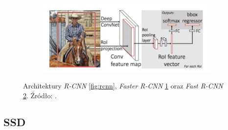 \begin{figure}
\begin{subfigure}[b]{0.45\textwidth}
         \caption{}
         \label{fig:ffrcnn}
     \end{subfigure}
     \hfill
    \begin{subfigure}[b]{0.9\textwidth}
         \centering
         \includegraphics[width=\textwidth]{images/frcnn.png}
         \caption{}
         \label{fig:frcnn}
     \end{subfigure}
     \hfill
     
    \caption{Architektury \emph{R-CNN} \ref{fig:rcnn}, \emph{Faster R-CNN} \ref{fig:ffrcnn} oraz \emph{Fast R-CNN} \ref{fig:frcnn}. Źródło: \cite{medium_rcnn}.}
    \label{fig:rcnns}
\end{figure}

\subsection{SSD}

